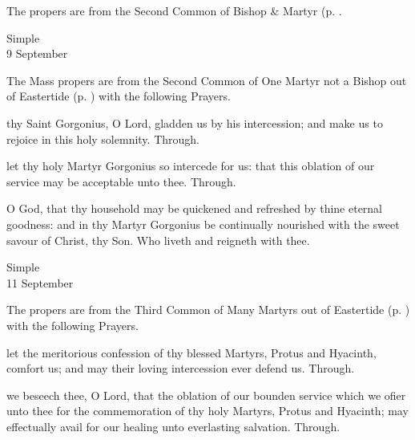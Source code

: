 \begin{rubric}
	The propers are from the Second Common of Bishop \& Martyr (p. \pageref{CommonMartyrBishopII}.
\end{rubric}

\begin{inhead}
	{Simple\\
		9 September}
\end{inhead}

\begin{rubric}
	The Mass propers are from the Second Common of One Martyr not a Bishop out of Eastertide (p. \pageref{CommonMartyrNotBishopII}) with the following Prayers.
\end{rubric}

\collect
{} thy Saint Gorgonius, O Lord, gladden us by his intercession; and make us to rejoice in this holy solemnity. Through.

\secret
{} let thy holy Martyr Gorgonius so intercede for us: that this oblation of our service may be acceptable unto thee. Through.

\postcommunion
{} O God, that thy household may be quickened and refreshed by thine eternal goodness: and in thy Martyr Gorgonius be continually nourished with the sweet savour of Christ, thy Son. Who liveth and reigneth with thee.

\begin{inhead}
	{Simple\\
		11 September}
\end{inhead}

\begin{rubric}
	The propers are from the Third Common of Many Martyrs out of Eastertide (p. \pageref{CommonMartyrsIII}) with the following Prayers.
\end{rubric}

\collect
{} let the meritorious confession of thy blessed Martyrs, Protus and Hyacinth, comfort us; and may their loving intercession ever defend us. Through.

\secret
{} we beseech thee, O Lord, that the oblation of our bounden service which we ofier unto thee for the commemoration of thy holy Martyrs, Protus and Hyacinth; may effectually avail for our healing unto everlasting salvation. Through.

